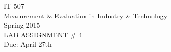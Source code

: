 \documentclass[letterpaper,10pt,oneside]{article}
\begin{document}
\setlength{\parindent}{0pt}
\setlength{\topmargin}{-1.65cm}
\renewcommand{\headrulewidth}{2pt} 
\renewcommand{\footrulewidth}{2pt}

\setlength{\parindent}{0cm}
\setlength{\headsep}{25pt}
\setlength{\footskip}{15pt}
\begin{center}
{\Large IT 507}\\
{\Large Measurement \& Evaluation in Industry \& Technology} \\
{\large Spring 2015} \\
LAB ASSIGNMENT \# 4\\
{\small Due: April 27th}
\end{center}




\nocite{Groebner2013}


\end{document}
